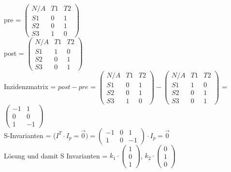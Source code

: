 \documentclass[10pt]{scrartcl}
\begin{document}
		pre =
		$\begin{pmatrix} N/A & T1 & T2 \\
						 S1 & 0 & 1 \\
						 S2 & 0 & 1 \\
						 S3 & 1 & 0 \end{pmatrix}$ \\ 
						 
		post =
		$\begin{pmatrix} N/A & T1 & T2 \\
						 S1 & 1 & 0 \\
						 S2 & 0 & 1 \\
						 S3 & 0 & 1 \end{pmatrix}$ \\ 
						 
		Inzidenzmatrix = $post - pre$ = $\begin{pmatrix} N/A & T1 & T2 \\
						 S1 & 0 & 1 \\
						 S2 & 0 & 1 \\
						 S3 & 1 & 0 \end{pmatrix}  - \begin{pmatrix} N/A & T1 & T2 \\
						 S1 & 1 & 0 \\
						 S2 & 0 & 1 \\
						 S3 & 0 & 1 \end{pmatrix}$  = $\begin{pmatrix} 
						 -1 & 1 \\
						 0 & 0 \\
						 1 & -1 \end{pmatrix}$\\
		S-Invarianten = ($I^T \cdotp I_p = \overrightarrow{0}) = \begin{pmatrix} 
						 -1 & 0 & 1 \\
						 1 & 0 & -1\end{pmatrix} \cdotp I_p= \overrightarrow{0}$ \\
		Lösung und damit S Invarianten = $k_1 \cdotp \begin{pmatrix} 
						 1 \\
						 0 \\
						 1 \end{pmatrix}$, $k_2 \cdotp \begin{pmatrix} 
						 0 \\
						 1 \\
						 0 \end{pmatrix}$\\
\end{document}
